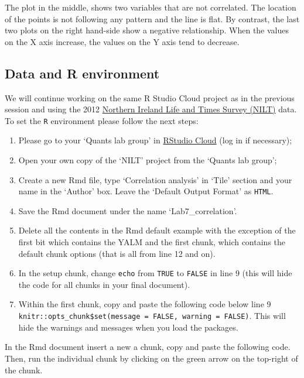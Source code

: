 \documentclass[
]{book}
\providecommand{\tightlist}{%
  \setlength{\itemsep}{0pt}\setlength{\parskip}{0pt}}
\begin{document}
The plot in the middle, shows two variables that are not correlated. The location of the points is not following any pattern and the line is flat. By contrast, the last two plots on the right hand-side show a negative relationship. When the values on the X axis increase, the values on the Y axis tend to decrease.

\hypertarget{data-and-r-environment}{%
\subsection{Data and R environment}\label{data-and-r-environment}}

We will continue working on the same R Studio Cloud project as in the previous session and using the 2012 \href{https://www.ark.ac.uk/nilt/}{Northern Ireland Life and Times Survey (NILT)} data. To set the \texttt{R} environment please follow the next steps:

\begin{enumerate}
\def\labelenumi{\arabic{enumi}.}
\tightlist
\item
  Please go to your `Quants lab group' in \href{https://rstudio.cloud/}{RStudio Cloud} (log in if necessary);
\item
  Open your own copy of the `NILT' project from the `Quants lab group';
\item
  Create a new Rmd file, type `Correlation analysis' in `Tile' section and your name in the `Author' box. Leave the `Default Output Format' as \texttt{HTML}.
\item
  Save the Rmd document under the name `Lab7\_correlation'.
\item
  Delete all the contents in the Rmd default example with the exception of the first bit which contains the YALM and the first chunk, which contains the default chunk options (that is all from line 12 and on).
\item
  In the setup chunk, change \texttt{echo} from \texttt{TRUE} to \texttt{FALSE} in line 9 (this will hide the code for all chunks in your final document).
\item
  Within the first chunk, copy and paste the following code below line 9 \texttt{knitr::opts\_chunk\$set(message\ =\ FALSE,\ warning\ =\ FALSE)}. This will hide the warnings and messages when you load the packages.
\end{enumerate}

In the Rmd document insert a new a chunk, copy and paste the following code. Then, run the individual chunk by clicking on the green arrow on the top-right of the chunk.
\end{document}
